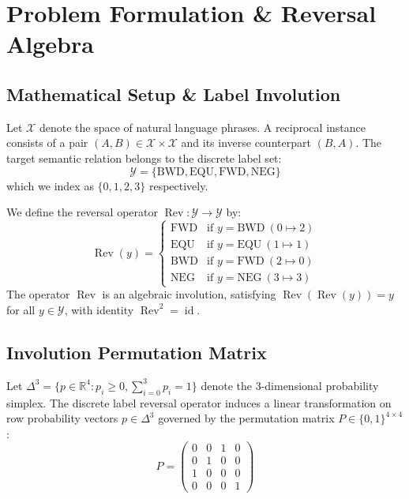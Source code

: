 \documentclass[11pt,a4paper,twocolumn]{article}
\begin{document}
\section{Problem Formulation \& Reversal Algebra}
\label{sec:formulation}

\subsection{Mathematical Setup \& Label Involution}
Let $\mathcal{X}$ denote the space of natural language phrases. A reciprocal instance consists of a pair $(A, B) \in \mathcal{X} \times \mathcal{X}$ and its inverse counterpart $(B, A)$. The target semantic relation belongs to the discrete label set:
\begin{equation}
\mathcal{Y} = \{\text{BWD}, \text{EQU}, \text{FWD}, \text{NEG}\}
\end{equation}
which we index as $\{0, 1, 2, 3\}$ respectively.

We define the reversal operator $\operatorname{Rev}: \mathcal{Y} \to \mathcal{Y}$ by:
\begin{equation}
\operatorname{Rev}(y) = 
\begin{cases}
\text{FWD} & \text{if } y = \text{BWD} \ (0 \mapsto 2) \\
\text{EQU} & \text{if } y = \text{EQU} \ (1 \mapsto 1) \\
\text{BWD} & \text{if } y = \text{FWD} \ (2 \mapsto 0) \\
\text{NEG} & \text{if } y = \text{NEG} \ (3 \mapsto 3)
\end{cases}
\end{equation}
The operator $\operatorname{Rev}$ is an algebraic involution, satisfying $\operatorname{Rev}(\operatorname{Rev}(y)) = y$ for all $y \in \mathcal{Y}$, with identity $\operatorname{Rev}^2 = \operatorname{id}$.

\subsection{Involution Permutation Matrix}
Let $\Delta^3 = \{p \in \mathbb{R}^4 : p_i \ge 0, \sum_{i=0}^3 p_i = 1\}$ denote the 3-dimensional probability simplex. The discrete label reversal operator induces a linear transformation on row probability vectors $p \in \Delta^3$ governed by the permutation matrix $P \in \{0, 1\}^{4 \times 4}$:
\begin{equation}
P = \begin{pmatrix}
0 & 0 & 1 & 0 \\
0 & 1 & 0 & 0 \\
1 & 0 & 0 & 0 \\
0 & 0 & 0 & 1
\end{pmatrix}
\end{equation}
\end{document}
